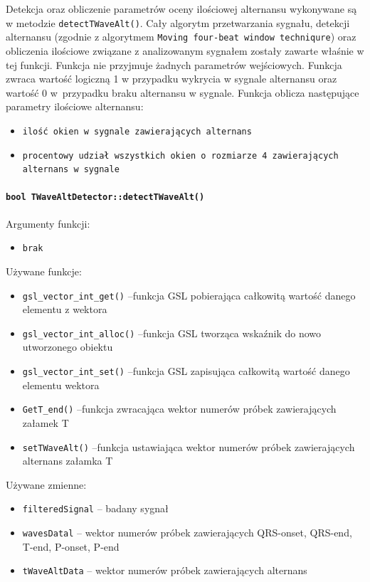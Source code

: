 \documentclass[a4paper, 11pt]{article}
\begin{document}
\medskip{}

Detekcja oraz obliczenie parametrów oceny ilościowej alternansu wykonywane są w metodzie  \verb|detectTWaveAlt()|. Cały algorytm przetwarzania sygnału, detekcji alternansu (zgodnie z algorytmem  \verb|Moving four-beat window techniqure|) oraz obliczenia ilościowe związane z analizowanym sygnałem zostały zawarte właśnie w tej funkcji. Funkcja nie przyjmuje żadnych parametrów wejściowych. Funkcja zwraca wartość logiczną 1 w przypadku wykrycia w sygnale alternansu oraz wartość 0 w~przypadku braku alternansu w sygnale. Funkcja oblicza następujące parametry ilościowe alternansu:
\begin{itemize}
\item \verb+ilość okien w sygnale zawierających alternans+
\item \verb+procentowy udział wszystkich okien o rozmiarze 4 zawierających alternans w sygnale+
\end{itemize}


\paragraph{\texttt{bool TWaveAltDetector::detectTWaveAlt()}}

\medskip{}

Argumenty funkcji:

\begin{itemize}
\item \verb+brak+
\end{itemize}
\medskip{}

Używane funkcje:
\begin{itemize}
\item \verb+gsl_vector_int_get()+ --funkcja GSL pobierająca całkowitą wartość danego elementu z wektora
\item \verb+gsl_vector_int_alloc()+ --funkcja GSL tworząca wskaźnik do nowo utworzonego obiektu 
\item \verb+gsl_vector_int_set()+ --funkcja GSL zapisująca całkowitą wartość danego elementu wektora
\item \verb+GetT_end()+ --funkcja zwracająca wektor numerów próbek zawierających załamek T
\item \verb+setTWaveAlt()+ --funkcja ustawiająca wektor numerów próbek zawierających alternans załamka T
\end{itemize}


\medskip{}

Używane zmienne:
\begin{itemize}
\item \verb+filteredSignal+ --  badany sygnał
\item \verb+wavesDatal+ -- wektor numerów próbek zawierających QRS-onset, QRS-end, T-end, P-onset, P-end
\item \verb+tWaveAltData+ -- wektor numerów próbek zawierających alternans
\end{itemize}
\end{document}
